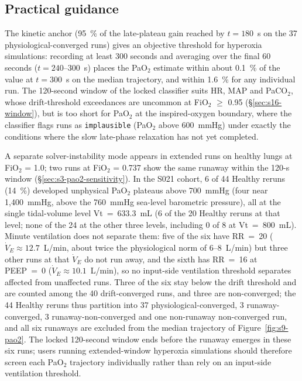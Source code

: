 \documentclass[pdflatex,sn-nature]{sn-jnl}%
\begin{document}
\subsection{Practical guidance}\label{sec:s9-guidance}

The kinetic anchor (95~\% of the late-plateau gain reached by $t = 180$~s on the 37 physiological-converged runs) gives an objective threshold for hyperoxia simulations: recording at least 300 seconds and averaging over the final 60 seconds ($t = 240$--$300$~s) places the PaO$_2$ estimate within about 0.1~\% of the value at $t = 300$~s on the median trajectory, and within 1.6~\% for any individual run. The 120-second window of the locked classifier suits HR, MAP and PaCO$_2$, whose drift-threshold exceedances are uncommon at FiO$_2$ $\geq$ 0.95 (\S\ref{sec:s16-window}), but is too short for PaO$_2$ at the inspired-oxygen boundary, where the classifier flags runs as \texttt{implausible} (PaO$_2$ above 600~mmHg) under exactly the conditions where the slow late-phase relaxation has not yet completed.

A separate solver-instability mode appears in extended runs on healthy lungs at FiO$_2$ = 1.0; two runs at FiO$_2$ = 0.737 show the same runaway within the 120-s window (\S\ref{sec:s3-pao2-sensitivity}). In the S021 cohort, 6 of 44 Healthy reruns (14~\%) developed unphysical PaO$_2$ plateaus above 700~mmHg (four near 1{,}400~mmHg, above the 760~mmHg sea-level barometric pressure), all at the single tidal-volume level Vt~=~633.3~mL (6 of the 20 Healthy reruns at that level; none of the 24 at the other three levels, including 0 of 8 at Vt~=~800~mL). Minute ventilation does not separate them: five of the six have RR~=~20 ($\dot{V}_E \approx 12.7$~L/min, about twice the physiological norm of 6--8~L/min) but three other runs at that $\dot{V}_E$ do not run away, and the sixth has RR~=~16 at PEEP~=~0 ($\dot{V}_E \approx 10.1$~L/min), so no input-side ventilation threshold separates affected from unaffected runs. Three of the six stay below the drift threshold and are counted among the 40 drift-converged runs, and three are non-converged; the 44 Healthy reruns thus partition into 37 physiological-converged, 3 runaway-converged, 3 runaway-non-converged and one non-runaway non-converged run, and all six runaways are excluded from the median trajectory of Figure~\ref{fig:s9-pao2}. The locked 120-second window ends before the runaway emerges in these six runs; users running extended-window hyperoxia simulations should therefore screen each PaO$_2$ trajectory individually rather than rely on an input-side ventilation threshold.
\end{document}
